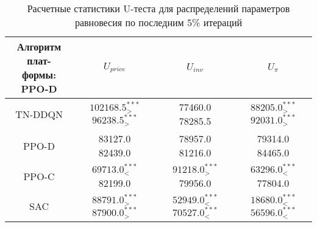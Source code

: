 \bgroup
\def\arraystretch{1.25}
\begin{table}[H]
	\caption{Расчетные статистики U-теста для распределений параметров равновесия по последним 5\% итераций}
	\label{tables:U_dynamic}
	\begin{center}
		\vspace{-0.5em}
		\begin{tabular}{c||ccc}
			\toprule
			\makecell{Алгоритм плат-\\ формы: PPO-D} & $U_{price}$ & $U_{inv}$ & $U_{\pi}$ \\
			\midrule
			TN-DDQN & \makecell[c]{ $102168.5^{***}_{>} $\\ $96238.5^{***}_{>} $\\[1ex] } & \makecell[c]{ 77460.0\\ 78285.5\\[1ex] } & \makecell[c]{ $88205.0^{***}_{>} $\\ $92031.0^{***}_{>} $\\[1ex] } \\
			PPO-D & \makecell[c]{ 83127.0\\ 82439.0\\[1ex] } & \makecell[c]{ 78957.0\\ 81216.0\\[1ex] } & \makecell[c]{ 79314.0\\ 84465.0\\[1ex] } \\
			PPO-C & \makecell[c]{ $69713.0^{***}_{<} $\\ 82199.0\\[1ex] } & \makecell[c]{ $91218.0^{***}_{>} $\\ 79956.0\\[1ex] } & \makecell[c]{ $63296.0^{***}_{<} $\\ 77804.0\\[1ex] } \\
			SAC & \makecell[c]{ $88791.0^{***}_{>} $\\ $87900.0^{***}_{>} $\\[1ex] } & \makecell[c]{ $52949.0^{***}_{<} $\\ $70527.0^{***}_{<} $\\[1ex] } & \makecell[c]{ $18680.0^{***}_{<} $\\ $56596.0^{***}_{<} $\\[1ex] } \\
			\bottomrule
		\end{tabular}
	\end{center}
\end{table}
\egroup